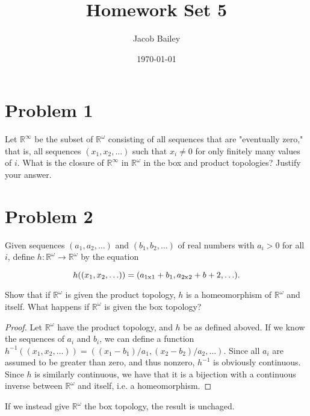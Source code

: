 \documentclass[11pt]{article}
\author{Jacob Bailey}
\date{\today}
\title{Homework Set 5}
\begin{document}
\maketitle

\section{Problem 1}
\label{sec:org4d2eab3}
Let \(\mathbb{R}^{\infty}\) be the subset of \(\mathbb{R}^{\omega}\) consisting of
all sequences that are "eventually zero," that is, all sequences \((x_1, x_2,
\ldots)\) such that \(x_i \not =0\) for only finitely many values of \(i\). What is
the closure of \(\mathbb{R}^{\infty}\) in \(\mathbb{R}^{\omega}\) in the box and
product topologies? Justify your answer. 

\section{Problem 2}
\label{sec:org53c449b}
Given sequences \((a_1, a_2, \ldots)\) and \((b_1, b_2, \ldots)\) of real numbers
with \(a_i > 0\) for all \(i\), define \(h:
\mathbb{R}^{\omega}\rightarrow\mathbb{R}^{\omega}\) by the equation

\begin{equation}
h((x\textsubscript{1}, x\textsubscript{2}, \ldots)) = (a\textsubscript{1x}\textsubscript{1} + b\textsubscript{1}, a\textsubscript{2x}\textsubscript{2} + b+2,\ldots).
\end{equation}

Show that if \(\mathbb{R}^{\omega}\) is given the product topology, \(h\) is a
homeomorphism of \(\mathbb{R}^{\omega}\) and itself. What happens if
\(\mathbb{R}^{\omega}\) is given the box topology? 

\begin{proof}
Let \(\mathbb{R}^{\omega}\) have the product topology, and \(h\) be as defined
aboved. If we know the sequences of \(a_i\) and \(b_i\), we can define a function
\(h^{-1}((x_1, x_2, \ldots)) = ((x_1 - b_1)/a_1, (x_2 - b_2)/a_2, \ldots)\). Since
all \(a_i\) are assumed to be greater than zero, and thus nonzero, \(h^{-1}\) is
obviously continuous. Since \(h\) is similarly continuous, we have that it is a
bijection with a continuous inverse between \(\mathbb{R}^{\omega}\) and itself,
i.e. a homeomorphism. 
\end{proof}

If we instead give \(\mathbb{R}^{\omega}\) the box topology, the result is
unchaged. 
\end{document}
